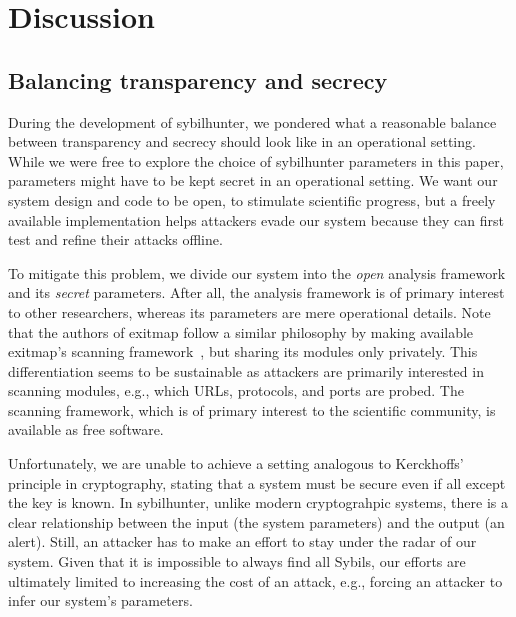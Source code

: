 \section{Discussion}
\label{sec:discussion}

\subsection{Balancing transparency and secrecy}
\label{sec:secrecy}
During the development of sybilhunter, we pondered what a reasonable balance
between transparency and secrecy should look like in an operational setting.
While we were free to explore the choice of sybilhunter parameters in this
paper, parameters might have to be kept secret in an operational setting.  We
want our system design and code to be open, to stimulate scientific progress,
but a freely available implementation helps attackers evade our system because
they can first test and refine their attacks offline.

To mitigate this problem, we divide our system into the \emph{open} analysis
framework and its \emph{secret} parameters.  After all, the analysis framework
is of primary interest to other researchers, whereas its parameters are mere
operational details.  Note that the authors of exitmap follow a similar
philosophy by making available exitmap's scanning framework~\cite{exitmap}, but
sharing its modules only privately.  This differentiation seems to be
sustainable as attackers are primarily interested in scanning modules, e.g.,
which URLs, protocols, and ports are probed.  The scanning framework, which is
of primary interest to the scientific community, is available as free software.

Unfortunately, we are unable to achieve a setting analogous to Kerckhoffs'
principle in cryptography, stating that a system must be secure even if all
except the key is known.  In sybilhunter, unlike modern cryptograhpic systems,
there is a clear relationship between the input (the system parameters) and the
output (an alert).  Still, an attacker has to make an effort to stay under the
radar of our system.  Given that it is impossible to always find all Sybils, our
efforts are ultimately limited to increasing the cost of an attack, e.g.,
forcing an attacker to infer our system's parameters.

